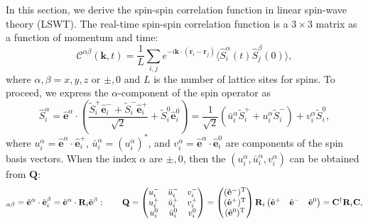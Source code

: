\documentclass[aps, prx, nofootinbib, superscriptaddress]{revtex4-2}
\begin{document}
In this section, we derive the spin-spin correlation function in linear spin-wave theory (LSWT). The real-time spin-spin correlation function is a $3 \times 3$ matrix as a function of momentum and time:
\begin{equation}
    \mathcal{C}^{\alpha\beta}(\mathbf{k}, t) = \frac{1}{L} \sum_{i, j} e^{-i \mathbf{k} \cdot (\mathbf{r}_{i} - \mathbf{r}_{j})} \langle \hat{S}_{i}^{\alpha}(t) \hat{S}_{j}^{\beta}(0) \rangle,
\end{equation}
where $\alpha, \beta = x, y, z$ or $\pm, 0$ and $L$ is the number of lattice sites for spins. To proceed, we express the $\alpha$-component of the spin operator as 
\begin{equation}
    \hat{S}^{\alpha}_{i} 
    = \hat{\mathbf{e}}^{\alpha} \cdot \left( \frac{\widetilde{S}_{i}^{+} \hat{\mathbf{e}}^{-}_{i} + \widetilde{S}_{i}^{-} \hat{\mathbf{e}}^{+}_{i}}{\sqrt{2}} + \widetilde{S}^{0}_{i} \hat{\mathbf{e}}^{0}_{i} \right) 
    = \frac{1}{\sqrt{2}} \left( \bar{u}^{\alpha}_{i} \widetilde{S}_{i}^{+} + u^{\alpha}_{i} \widetilde{S}_{i}^{-} \right) + v^{\alpha}_{i} \widetilde{S}^{0}_{i},
\end{equation}
where $u^{\alpha}_{i} = \hat{\mathbf{e}}^{\alpha} \cdot \hat{\mathbf{e}}^{+}_{i}$, $\bar{u}^{\alpha}_{i} = (u^{\alpha}_{i})^*$, and $v^{\alpha}_{i} = \hat{\mathbf{e}}^{\alpha} \cdot \hat{\mathbf{e}}^{0}_{i}$ are components of the spin basis vectors. 
When the index $\alpha$ are $\pm,0$, then the $(u^{\alpha}_{i}, \bar{u}^{\alpha}_{i}, v^{\alpha}_{i})$ can be obtained from $\mathbf{Q}$:
\begin{equation}
    [\mathbf{Q}]_{\alpha\beta} = 
    \hat{\bf e}^{\alpha} \cdot \hat{\bf e}^{\beta}_{i} = 
    \hat{\bf e}^{\alpha} \cdot \mathbf{R}_{i} \hat{\bf e}^{\beta}: 
    \qquad
    \mathbf{Q}
    =
    \begin{pmatrix}
            u^{-}_{i} &   \bar{u}^{-}_{i}     &   v_{i}^{-}   \\
            u^{+}_{i} &   \bar{u}^{+}_{i}     &   v_{i}^{+}   \\
            u^{0}_{i} &   \bar{u}^{0}_{i}     &   v_{i}^{0}   \\
    \end{pmatrix}
    = 
    \begin{pmatrix}
        (\hat{\bf e}^{-})^{\rm T} \\  
        (\hat{\bf e}^{+})^{\rm T} \\  
        (\hat{\bf e}^{0})^{\rm T} 
    \end{pmatrix}
    \mathbf{R}_{i}
    \begin{pmatrix}
        \hat{\bf e}^{+} & \hat{\bf e}^{-} & \hat{\bf e}^{0}
    \end{pmatrix}
    = \mathbf{C}^{\dagger} \mathbf{R}_{i} \mathbf{C},
\end{equation}
\end{document}
